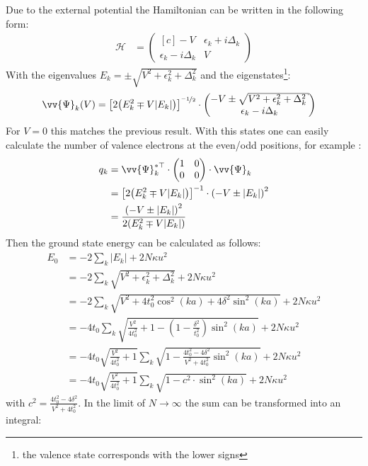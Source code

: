 Due to the external potential the Hamiltonian can be written in the following form:
\begin{align}
	\mathcal{H} &= \begin{pmatrix*}[c]
	-V & \epsilon_k + i \Delta_k \\
	\epsilon_k - i \Delta_k & V
	\end{pmatrix*}
\end{align}
With the eigenvalues $E_k = \pm \sqrt{V^2+\epsilon_k^2+\Delta_k^2}$ and the eigenstates\footnote{the valence state corresponds with the lower signs}:
\begin{align}
	\vv{\Psi}_k(V) &= \left[2\left(E_k^2\mp V|E_k|\right)\right]^{\nicefrac{-1}{2}} \cdot \begin{pmatrix*}[c]
	-V\pm \sqrt{V^2+\epsilon_k^2+\Delta_k^2}\\
	\epsilon_k - i \Delta_k
	\end{pmatrix*}
\end{align}
For $V=0$ this matches the previous result. With this states one can easily calculate the number of valence electrons at the even/odd positions, for example :
\begin{align}
	q_k &= \vv{\Psi}_k^{*\top}\cdot\begin{pmatrix*}[c]
	1 & 0\\
	0 & 0
	\end{pmatrix*}\cdot \vv{\Psi}_k\\
	&= \left[2\left(E_k^2\mp V|E_k|\right)\right]^{-1} \cdot \left(-V\pm |E_k|\right)^2\\
	&= \frac{\left(-V \pm |E_k|\right)^2}{2\left(E_k^2\mp V|E_k|\right)}
\end{align}
Then the ground state energy can be calculated as follows:
\begin{align}
	E_0 &= -2\sum_k |E_k| + 2N\kappa u^2\\
	&= -2 \sum_k \sqrt{V^2+\epsilon_k^2+\Delta_k^2}+ 2N\kappa u^2\\
	&= -2 \sum_k \sqrt{V^2 + 4t_0^2\cos^2(ka) + 4 \delta^2\sin^2(ka)}+ 2N\kappa u^2\\
	&= -4t_0 \sum_k\sqrt{\frac{V^2}{4t_0^2} + 1 - \left(1-\frac{\delta^2}{t_0^2}\right)\sin^2(ka)}+ 2N\kappa u^2\\
	&= -4t_0 \sqrt{\frac{V^2}{4t_0^2}+1}\sum_k \sqrt{1 - \frac{4t_0^2-4\delta^2}{V^2+4t_0^2} \sin^2(ka)}+ 2N\kappa u^2\\
	&= -4t_0 \sqrt{\frac{V^2}{4t_0^2}+1}\sum_k \sqrt{1 - c^2 \cdot \sin^2(ka)}+ 2N\kappa u^2
\end{align} 
with $c^2 = \frac{4t_0^2-4\delta^2}{V^2+4t_0^2}$. In the limit of $N \to \infty$ the sum can be transformed into an integral:
